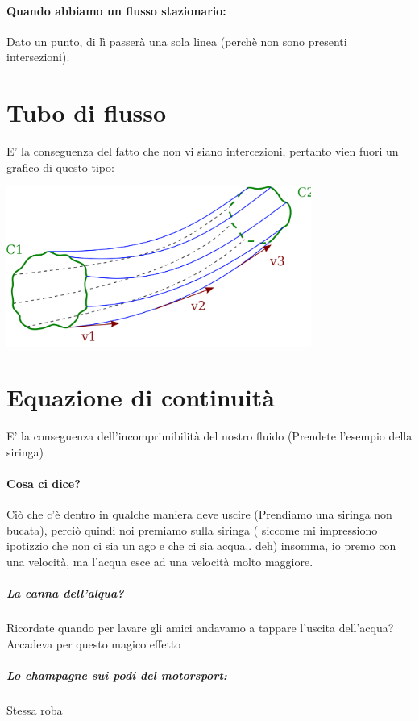 \documentclass[12pt, a4paper, openany, oneside]{book}
\begin{document}
\paragraph{Quando abbiamo un flusso stazionario: }Dato un punto, di lì passerà
una sola linea (perchè non sono presenti intersezioni). 
\section{Tubo di flusso}
E' la conseguenza del fatto che non vi siano intercezioni, pertanto vien fuori
un grafico di questo tipo:
\begin{center}
\includegraphics[width=0.75\textwidth]{9}
\end{center}
\section{Equazione di continuità}
E' la conseguenza dell'incomprimibilità del nostro fluido (Prendete l'esempio
della siringa)
\paragraph{Cosa ci dice? }Ciò che c'è dentro in qualche maniera deve uscire 
(Prendiamo una siringa non bucata), perciò quindi noi premiamo sulla siringa (
siccome mi impressiono ipotizzio che non ci sia un ago e che ci sia acqua.. deh)
insomma, io premo con una velocità, ma l'acqua esce ad una velocità molto maggiore.
\subparagraph{La canna dell'alqua? }Ricordate quando per lavare gli amici andavamo
a tappare l'uscita dell'acqua? Accadeva per questo magico effetto
\subparagraph{Lo champagne sui podi del motorsport: }Stessa roba
\end{document}
